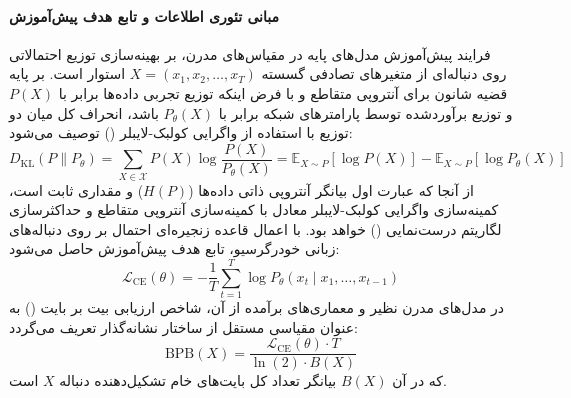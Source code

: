 \item {}

\paragraph*{مبانی تئوری اطلاعات و تابع هدف پیش‌آموزش}
فرایند پیش‌آموزش مدل‌های پایه در مقیاس‌های مدرن، بر بهینه‌سازی توزیع احتمالاتی روی دنباله‌ای از متغیرهای تصادفی گسسته $X = (x_1, x_2, \dots, x_T)$ استوار است. بر پایه قضیه شانون برای آنتروپی متقاطع و با فرض اینکه توزیع تجربی داده‌ها برابر با $P(X)$ و توزیع برآوردشده توسط پارامترهای شبکه برابر با $P_\theta(X)$ باشد، انحراف کل میان دو توزیع با استفاده از واگرایی کولبک-لایبلر () توصیف می‌شود:
\begin{equation}
    D_{\text{KL}}(P \parallel P_\theta) = \sum_{X \in \mathcal{X}} P(X) \log \frac{P(X)}{P_\theta(X)} = \mathbb{E}_{X \sim P}[\log P(X)] - \mathbb{E}_{X \sim P}[\log P_\theta(X)]
\end{equation}
از آنجا که عبارت اول بیانگر آنتروپی ذاتی داده‌ها ($H(P)$) و مقداری ثابت است، کمینه‌سازی واگرایی کولبک-لایبلر معادل با کمینه‌سازی آنتروپی متقاطع و حداکثرسازی لگاریتم درست‌نمایی () خواهد بود. با اعمال قاعده زنجیره‌ای احتمال بر روی دنباله‌های زبانی خودرگرسیو، تابع هدف پیش‌آموزش حاصل می‌شود:
\begin{equation}
    \mathcal{L}_{\text{CE}}(\theta) = -\frac{1}{T} \sum_{t=1}^T \log P_\theta(x_t \mid x_1, \dots, x_{t-1})
\end{equation}
در مدل‌های مدرن نظیر  و معماری‌های برآمده از آن، شاخص ارزیابی بیت بر بایت () به عنوان مقیاسی مستقل از ساختار نشانه‌گذار تعریف می‌گردد:
\begin{equation}
    \text{BPB}(X) = \frac{\mathcal{L}_{\text{CE}}(\theta) \cdot T}{\ln(2) \cdot B(X)}
\end{equation}
که در آن $B(X)$ بیانگر تعداد کل بایت‌های خام  تشکیل‌دهنده دنباله $X$ است.

